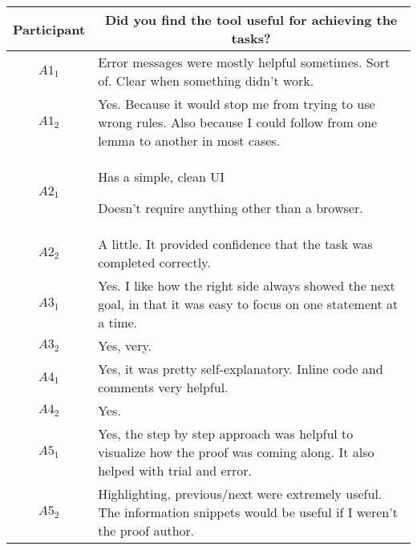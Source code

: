 \noindent
\begin{tabularx}{\linewidth}{@{}cX@{}}
  \toprule
  Participant & \multicolumn{1}{c}{
    \textbf{Did you find the tool useful for achieving the tasks?}
  } \\ \midrule
  $A1_{1}$ & Error messages were mostly helpful sometimes. Sort of. Clear when something didn't work. \\
  $A1_{2}$ & Yes.  Because it would stop me from trying to use wrong rules.  Also because I could follow from one lemma to another in most cases. \\
  $A2_{1}$ & \begin{enumerate*} \item Has a simple, clean UI \item Doesn't require anything other than a browser. \end{enumerate*} \\
  $A2_{2}$ & A little.  It provided confidence that the task was completed correctly. \\
  $A3_{1}$ & Yes.  I like how the right side always showed the next goal, in that it was easy to focus on one statement at a time. \\
  $A3_{2}$ & Yes, very. \\
  $A4_{1}$ & Yes, it was pretty self-explanatory.  Inline code and comments very helpful. \\
  $A4_{2}$ & Yes. \\
  $A5_{1}$ & Yes, the step by step approach was helpful to visualize how the proof was coming along.  It also helped with trial and error. \\
  $A5_{2}$ & Highlighting, previous/next were extremely useful.  The information snippets would be useful if I weren't the proof author. \\
\end{tabularx}{\parfillskip=0pt\par}

\clearpage


